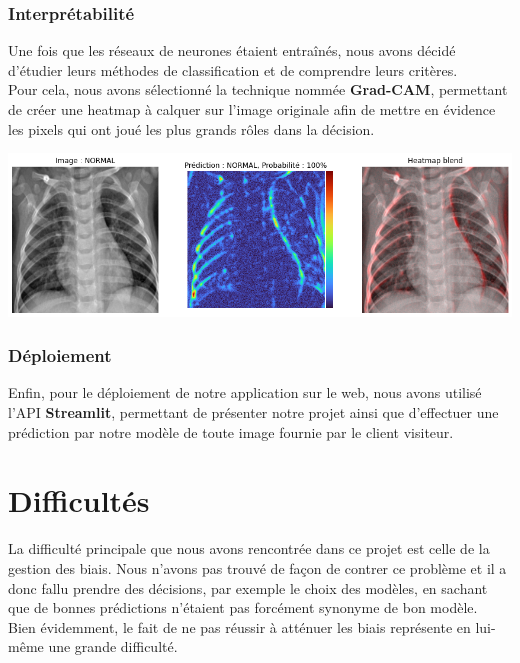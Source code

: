 \documentclass{article}
\begin{document}
	\subsubsection*{Interprétabilité}
	
	Une fois que les réseaux de neurones étaient entraînés, nous avons décidé d'étudier leurs méthodes de classification et de comprendre leurs critères.\\
	Pour cela, nous avons sélectionné la technique nommée \textbf{Grad-CAM}, permettant de créer une heatmap à calquer sur l'image originale afin de mettre en évidence les pixels qui ont joué les plus grands rôles dans la décision.
	
	\begin{center}
	\includegraphics[scale=0.5]{interp.png}
	\end{center}
	
	\subsubsection*{Déploiement}
	
	Enfin, pour le déploiement de notre application sur le web, nous avons utilisé l'API \textbf{Streamlit}, permettant de présenter notre projet ainsi que d'effectuer une prédiction par notre modèle de toute image fournie par le client visiteur.
	
	\section*{Difficultés}
	
	La difficulté principale que nous avons rencontrée dans ce projet est celle de la gestion des biais. Nous n'avons pas trouvé de façon de contrer ce problème et il a donc fallu prendre des décisions, par exemple le choix des modèles, en sachant que de bonnes prédictions n'étaient pas forcément synonyme de bon modèle.\\
	Bien évidemment, le fait de ne pas réussir à atténuer les biais représente en lui-même une grande difficulté.
	
\end{document}
